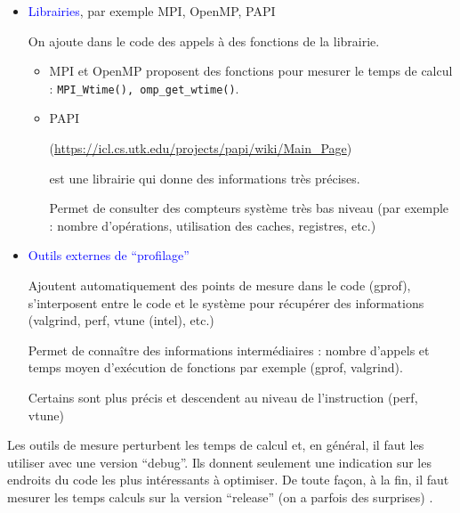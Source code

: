 \documentclass{beamer}
\begin{document}
\begin{frame}
	\begin{itemize}
	\item \textcolor{blue}{Librairies}, par exemple MPI, OpenMP, PAPI
	
	On ajoute dans le code des appels à des fonctions de la librairie.

	\medskip
	\begin{itemize}
	\item MPI et OpenMP proposent des fonctions pour mesurer le temps de calcul :	{\tt MPI\_Wtime(), omp\_get\_wtime()}.
	\medskip
	
	\item PAPI 
	
	\hbox{\small(\url{https://icl.cs.utk.edu/projects/papi/wiki/Main_Page})}
	\medskip
	
	est une librairie qui donne des informations très précises.
	
	\medskip
	 Permet de consulter des compteurs système très bas niveau (par exemple : nombre
	 d’opérations, utilisation des caches, registres, etc.)
	\end{itemize}
	\end{itemize}

	
\end{frame}

\begin{frame}
	\begin{itemize}
	\item  \textcolor{blue}{Outils externes de ``profilage''}
	
	\medskip
	Ajoutent automatiquement des points de mesure dans le
	code (gprof), s’interposent entre le code et le système pour récupérer des informations
	(valgrind, perf,
vtune (intel), etc.)
		
	\medskip
	Permet de connaître des informations intermédiaires : nombre d’appels et temps
	moyen d’exécution de fonctions par exemple (gprof, valgrind).
	
	Certains sont plus précis et descendent au niveau de l'instruction (perf, vtune)
	\end{itemize}

\vfill
	Les outils de mesure perturbent les temps de calcul et, en général, il faut les utiliser avec
	une version ``debug''. Ils donnent seulement une indication sur les endroits du code les plus
	intéressants à optimiser. De toute façon, à la fin, il faut mesurer les temps calculs sur la
	version ``release'' (on a parfois des surprises) .
\end{frame}
\end{document}
